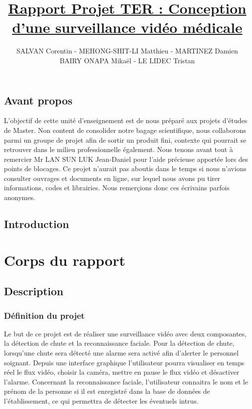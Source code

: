 \documentclass[a4paper]{report}
\author{SALVAN Corentin - MEHONG-SHIT-LI Matthieu - MARTINEZ Damien \\ BAIRY ONAPA Mikaël - LE LIDEC Tristan}
\title{\underline{Rapport Projet TER : Conception d'une surveillance vidéo médicale}}
\begin{document}
    \maketitle
      
    \chapter*{Avant propos}

    L'objectif de cette unité d'enseignement est de nous préparé aux projets d'études de Master.
    Non content de consolider notre bagage scientifique, nous collaborons parmi un groupe de projet
    afin de sortir un produit fini, contexte qui pourrait se retrouver dans le milieu professionnelle
    également.
    Nous tenons avant tout à remercier Mr LAN SUN LUK Jean-Daniel pour l'aide précieuse apportée
    lors des points de blocages. Ce projet n'aurait pas aboutis dans le temps si nous n'avions consulter
    ouvrages et documents en ligne, sur lequel nous avons pu tirer informations, codes et librairies.
    Nous remerçions donc ces écrivains parfois anonymes.
    
    \chapter*{Introduction}
    
    
    \tableofcontents
    
    \part{Corps du rapport}
    
    \chapter{Description}
    
        \section{Définition du projet}
        
    Le but de ce projet est de réaliser une surveillance vidéo avec deux composantes, la détection de chute et la reconnaissance faciale.
    Pour la détection de chute, lorsqu'une chute sera détecté une alarme sera activé afin d'alerter le personnel soignant. Depuis une interface graphique l'utilisateur pourra visualiser en temps réel le flux vidéo, choisir la caméra, mettre en pause le flux vidéo et désactiver l'alarme. Concernant la reconnaissance faciale, l'utilisateur connaitra le nom et le prénom de la personne si il est enregistré dans la base de données de l'établissement, ce qui permettra de détecter les éventuels intrus.
    
\end{document}
